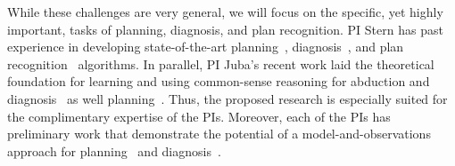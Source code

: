While these challenges are very  general, we will focus on the specific, yet highly important, tasks of planning, diagnosis, and plan recognition. PI Stern has past experience in developing state-of-the-art planning~\cite{felner2004pha,sharon2013increasing,sharon2015conflict,goldenberg2014enhanced,stern2014potential,maliah2016collaborative}, diagnosis~\cite{stern2012exploring,stern2014model,stern2014hierarchical}, and plan recognition~\cite{mirsky2016sequential} algorithms. 
In parallel, PI Juba's recent work laid the theoretical foundation for learning and using common-sense reasoning for abduction and diagnosis~\cite{juba2016aaai} as well planning~\cite{juba2016jmlr}. %
Thus, the proposed research is especially suited for the complimentary expertise of the PIs. %
Moreover, each of the PIs has preliminary work that demonstrate the potential of a model-and-observations approach for planning~\cite{stern2011probably,stern2012exploring,juba2016jmlr} and diagnosis~\cite{elmishali2016dataAugmented}.

